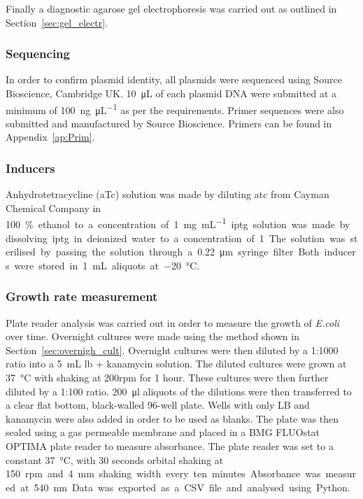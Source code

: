 Finally a diagnostic agarose gel electrophoresis was carried out as outlined in Section~\ref{sec:gel_electr}.

\subsubsection{Sequencing}
In order to confirm plasmid identity, all plasmids were sequenced using Source Bioscience, Cambridge UK. \SI{10}{\micro\liter}  of each plasmid DNA were submitted at a minimum of \SI{100}{\nano\gram\per\micro\liter} as per the requirements. Primer sequences were also submitted and manufactured by Source Bioscience. Primers can be found in Appendix~\ref{ap:Prim}. 

\subsubsection{Inducers}

Anhydrotetracycline (aTc) solution was made by diluting \acrshort{atc} from Cayman Chemical Company in \SI{100}\% ethanol to a concentration of \SI{1}{\milli\gram\per\milli\liter}. \acrfull{iptg} solution was made by dissolving \acrshort{iptg} in deionized water to a concentration of \SI{1}{\molar}. The solution was sterilised by passing the solution through a \SI{0.22}{\micro\meter} syringe filter. Both inducers were stored in \SI{1}{\milli\liter} aliquots at \SI{-20}{\celsius}. 


\subsubsection{Growth rate measurement}
\label{sec:growth_meth}
Plate reader analysis was carried out in order to measure the growth of \textit{E.coli} over time. Overnight cultures were made using the method shown in Section~\ref{sec:overnigh_cult}. Overnight cultures were then diluted by a 1:1000 ratio into a \SI{5}{\milli\liter} \acrshort{lb} + kanamycin solution. The diluted cultures were grown at \SI{37}{\celsius} with shaking at 200rpm for 1 hour. These cultures were then further diluted by a 1:100 ratio. \SI{200}{\ul} aliquots of the dilutions were then transferred to a clear flat bottom, black-walled 96-well plate. Wells with only LB and kanamycin were also added in order to be used as blanks. The plate was then sealed using a gas permeable membrane and placed in a BMG FLUOstat OPTIMA plate reader to measure absorbance. The plate reader was set to a constant \SI{37}{\celsius}, with 30 seconds orbital shaking at \SI{150}rpm and \SI{4}{\milli\metre} shaking width every ten minutes. Absorbance was measured at \SI{540}{\nano\meter}. Data was exported as a CSV file and analysed using Python. 


